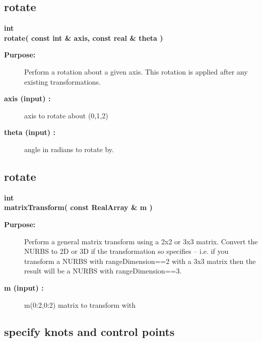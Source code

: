 \subsection{rotate}
 
\begin{flushleft} \textbf{%
int  \\ 
\settowidth{\NurbsMappingIncludeArgIndent}{rotate(}%
rotate( const int \& axis, const real \& theta )
}\end{flushleft}
\begin{description}
\item[{\bf Purpose:}]  Perform a rotation about a given axis. This rotation is applied
   after any existing transformations. 
\item[{\bf axis (input) :}]  axis to rotate about (0,1,2)
\item[{\bf theta (input) :}]  angle in radians to rotate by.
\end{description}
\subsection{rotate}
 
\begin{flushleft} \textbf{%
int  \\ 
\settowidth{\NurbsMappingIncludeArgIndent}{matrixTransform(}%
matrixTransform( const RealArray \& m )
}\end{flushleft}
\begin{description}
\item[{\bf Purpose:}]  
    Perform a general matrix transform using a 2x2 or 3x3 matrix.
  Convert the NURBS to 2D or 3D if the transformation so specifies -- i.e.
 if you transform a NURBS with rangeDimension==2 with a 3x3 matrix then the
 result will be a NURBS with rangeDimension==3.
\item[{\bf m (input) :}]  m(0:2,0:2) matrix to transform with
\end{description}
\subsection{specify knots and control points}
 
